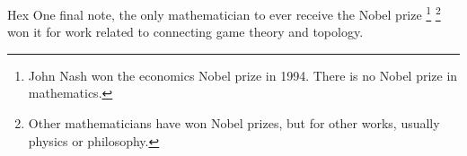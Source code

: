 \documentclass{beamer}
\begin{document}
    \begin{frame}{Hex}
        One final note, the only mathematician to ever receive the Nobel prize%
        \footnote{John Nash won the economics Nobel prize in 1994. There is no Nobel prize in mathematics.}
        \footnote{Other mathematicians have won Nobel prizes, but for other works, usually physics or philosophy.}
        won it for work related to connecting game theory and topology.
    \end{frame}
\end{document}
